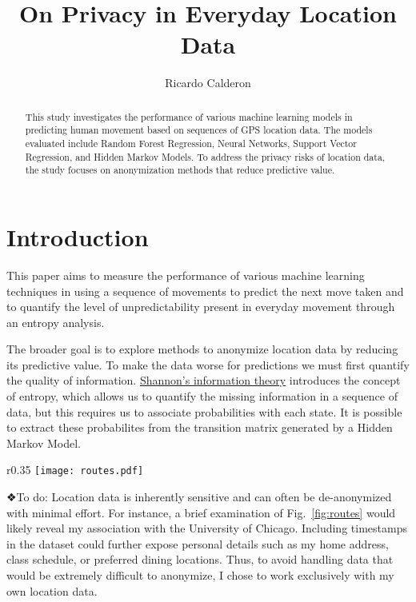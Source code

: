 \documentclass[11pt]{amsart}
\begin{document}
\title{On Privacy in Everyday Location Data} %
\author{Ricardo Calderon}
\maketitle
\begin{abstract}
    This study investigates the performance of various machine learning models in predicting human movement based on sequences of GPS location data.
    The models evaluated include Random Forest Regression, Neural Networks, Support Vector Regression, and Hidden Markov Models.
    To address the privacy risks of location data, the study focuses on anonymization methods that reduce predictive value.
\end{abstract}
\section{Introduction}

This paper aims to measure the performance of various machine learning techniques in using a sequence of movements to predict the next move taken and to quantify the level of unpredictability present in everyday movement through an entropy analysis.

The broader goal is to explore methods to anonymize location data by reducing its predictive value.
To make the data worse for predictions we must first quantify the quality of information.
\href{https://en.wikipedia.org/wiki/Entropy_(information_theory)}{Shannon's information theory} introduces the concept of entropy, which allows us to quantify the missing information in a sequence of data, but this requires us to associate probabilities with each state.
It is possible to extract these probabilites from the transition matrix generated by a Hidden Markov Model.

\begin{wrapfigure}{r}{0.35\textwidth}
\centering
\vspace{-.75cm}
\texttt{[image: routes.pdf]} %
\caption{\small Visited locations in Chicago, with dots representing collected locations and route segments shown in different colors.}
\label{fig:routes}
\end{wrapfigure}

❖To do:
Location data is inherently sensitive and can often be de-anonymized with minimal effort.
For instance, a brief examination of Fig.~\ref{fig:routes} would likely reveal my association with the University of Chicago.
Including timestamps in the dataset could further expose personal details such as my home address, class schedule, or preferred dining locations.
Thus, to avoid handling data that would be extremely difficult to anonymize, I chose to work exclusively with my own location data.
\end{document}
